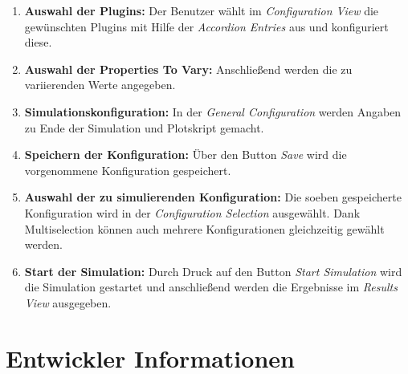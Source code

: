\documentclass[a4paper, 11pt]{article} %
\begin{document}
\begin{enumerate}
\item \textbf{Auswahl der Plugins:} \newline Der Benutzer wählt im \emph{Configuration View} die gewünschten Plugins mit Hilfe der \emph{Accordion Entries} aus und konfiguriert diese.
\item \textbf{Auswahl der Properties To Vary:} \newline Anschließend werden die zu variierenden Werte angegeben.
\item \textbf{Simulationskonfiguration:} \newline In der \emph{General Configuration} werden Angaben zu Ende der Simulation und Plotskript gemacht.
\item \textbf{Speichern der Konfiguration:} \newline Über den Button \emph{Save} wird die vorgenommene Konfiguration gespeichert.
\item \textbf{Auswahl der zu simulierenden Konfiguration:} \newline Die soeben gespeicherte Konfiguration wird in der \emph{Configuration Selection} ausgewählt. Dank Multiselection können auch mehrere Konfigurationen gleichzeitig gewählt werden.
\item \textbf{Start der Simulation:} \newline Durch Druck auf den Button \emph{Start Simulation} wird die Simulation gestartet und anschließend werden die Ergebnisse im \emph{Results View} ausgegeben. 
\end{enumerate}
\section{Entwickler Informationen} %
\label{sec:entwicklung}


% 
% 

\end{document}
